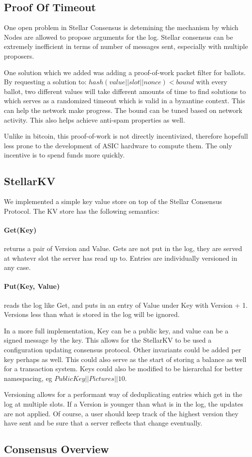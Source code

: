 \documentclass[preprint,11pt]{article}
\begin{document}
\subsection{Proof Of Timeout}
One open problem in Stellar Consensus is detemining the mechanism by
which Nodes are allowed to propose arguments for the log. Stellar
consensus can be extremely inefficient in terms of number of messages
sent, especially with multiple proposers.

One solution which we added was adding a proof-of-work packet filter for
ballots. By requesting a solution to: $hash(value || slot || nonce) < bound$
with every ballot, two different values will take different amounts of
time to find solutions to which serves as a randomized timeout which
is valid in a byzantine context. This can help the network make
progress. The bound can be tuned based on network activity. This also helps
achieve anti-spam properties as well.

Unlike in bitcoin, this proof-of-work is not directly incentivized,
therefore hopefull less prone to the development of ASIC hardware to
compute them. The only incentive is to spend funds more quickly.

\subsection{StellarKV}
We implemented a simple key value store on top of the Stellar
Consensus Protocol. The KV store has the following semantics:

\paragraph{Get(Key)} returns a pair of Version and Value. Gets are not put in the log, they are served
at whatevr slot the server has read up to. Entries are individually
versioned in any case.
\paragraph{Put(Key, Value)}  reads the log like Get, and puts in an entry of Value under Key with Version + 1. Versions less than what is stored in the log will be ignored.


In a more full implementation, Key can be a public key, and value can
be a signed message by the key. This allows for the StellarKV to be
used a configuration updating consensus protocol. Other invariants
could be added per key perhaps as well. This could also serve as the
start of storing a balance as well for a transaction system. Keys
could also be modified to be hierarchal for better namespacing, eg
$Public Key||Pictures||10$.

Versioning allows for a performant way of deduplicating entries which
get in the log at multiple slots. If a Version is younger than what is
in the log, the updates are not applied. Of course, a user should keep
track of the highest version they have sent and be sure that a server
reflects that change eventually.

\subsection{Consensus Overview}
\end{document}
